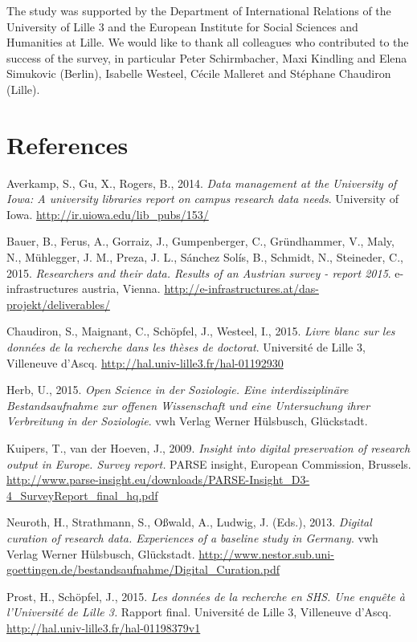 \documentclass[a4paper,
fontsize=11pt,
oneside,
numbers=noperiodatend,
parskip=half-,
bibliography=totoc,
final
]{scrartcl}
\begin{document}
The study was supported by the Department of International Relations of
the University of Lille 3 and the European Institute for Social Sciences
and Humanities at Lille. We would like to thank all colleagues who
contributed to the success of the survey, in particular Peter
Schirmbacher, Maxi Kindling and Elena Simukovic (Berlin), Isabelle
Westeel, Cécile Malleret and Stéphane Chaudiron (Lille).

\section*{References}\label{references}

Averkamp, S., Gu, X., Rogers, B., 2014. \emph{Data management at the
University of Iowa: A university libraries report on campus research
data needs}. University of Iowa. \url{http://ir.uiowa.edu/lib_pubs/153/}

Bauer, B., Ferus, A., Gorraiz, J., Gumpenberger, C., Gründhammer, V.,
Maly, N., Mühlegger, J. M., Preza, J. L., Sánchez Solís, B., Schmidt,
N., Steineder, C., 2015. \emph{Researchers and their data. Results of an
Austrian survey - report 2015}. e-infrastructures austria, Vienna.
\url{http://e-infrastructures.at/das-projekt/deliverables/}

Chaudiron, S., Maignant, C., Schöpfel, J., Westeel, I., 2015.
\emph{Livre blanc sur les données de la recherche dans les thèses de
doctorat}. Université de Lille 3, Villeneuve d'Ascq.
\url{http://hal.univ-lille3.fr/hal-01192930}

Herb, U., 2015. \emph{Open Science in der Soziologie. Eine
interdisziplinäre Bestandsaufnahme zur offenen Wissenschaft und eine
Untersuchung ihrer Verbreitung in der Soziologie}. vwh Verlag Werner
Hülsbusch, Glückstadt.

Kuipers, T., van der Hoeven, J., 2009. \emph{Insight into digital
preservation of research output in Europe. Survey report.} PARSE
insight, European Commission, Brussels.
\url{http://www.parse-insight.eu/downloads/PARSE-Insight_D3-4_SurveyReport_final_hq.pdf}

Neuroth, H., Strathmann, S., Oßwald, A., Ludwig, J. (Eds.), 2013.
\emph{Digital curation of research data. Experiences of a baseline study
in Germany}. vwh Verlag Werner Hülsbusch, Glückstadt.
\url{http://www.nestor.sub.uni-goettingen.de/bestandsaufnahme/Digital_Curation.pdf}

Prost, H., Schöpfel, J., 2015. \emph{Les données de la recherche en SHS.
Une enquête à l'Université de Lille 3.} Rapport final. Université de
Lille 3, Villeneuve d'Ascq.
\url{http://hal.univ-lille3.fr/hal-01198379v1}
\end{document}
